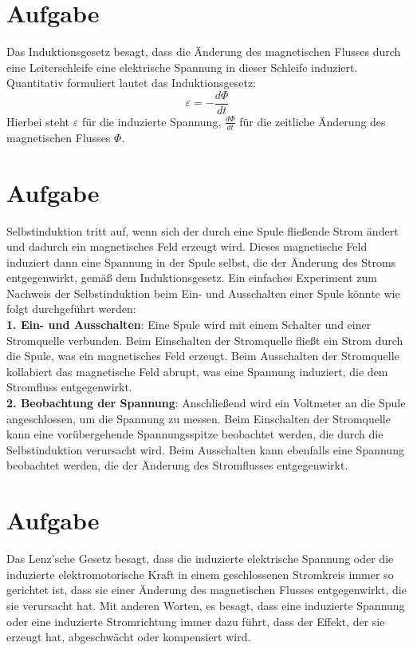 \documentclass[12pt,a4paper]{report}
\begin{document}
	\section{Aufgabe}
	Das Induktionsgesetz besagt, dass die Änderung des magnetischen Flusses durch eine Leiterschleife eine elektrische Spannung in dieser Schleife induziert. Quantitativ formuliert lautet das Induktionsgesetz:
	\[ \varepsilon = - \frac{d\Phi}{dt} \]
	Hierbei steht \( \varepsilon \) für die induzierte Spannung, \( \frac{d\Phi}{dt} \) für die zeitliche Änderung des magnetischen Flusses \( \Phi \).
	\section{Aufgabe}
	Selbstinduktion tritt auf, wenn sich der durch eine Spule fließende Strom ändert und dadurch ein magnetisches Feld erzeugt wird.
	Dieses magnetische Feld induziert dann eine Spannung in der Spule selbst, die der Änderung des Stroms entgegenwirkt, gemäß dem Induktionsgesetz.
	Ein einfaches Experiment zum Nachweis der Selbstinduktion beim Ein- und Ausschalten einer Spule könnte wie folgt durchgeführt werden:\\
	\textbf{1. Ein- und Ausschalten}: Eine Spule wird mit einem Schalter und einer Stromquelle verbunden.
	Beim Einschalten der Stromquelle fließt ein Strom durch die Spule, was ein magnetisches Feld erzeugt.
	Beim Ausschalten der Stromquelle kollabiert das magnetische Feld abrupt, was eine Spannung induziert, die dem Stromfluss entgegenwirkt.\\
	\textbf{2. Beobachtung der Spannung}: Anschließend wird ein Voltmeter an die Spule angeschlossen, um die Spannung zu messen.
	Beim Einschalten der Stromquelle kann eine vorübergehende Spannungsspitze beobachtet werden, die durch die Selbstinduktion verursacht wird.
	Beim Ausschalten kann ebenfalls eine Spannung beobachtet werden, die der Änderung des Stromflusses entgegenwirkt.
	\thispagestyle{empty}
	\section{Aufgabe}
	Das Lenz'sche Gesetz besagt, dass die induzierte elektrische Spannung oder die induzierte elektromotorische Kraft in einem geschlossenen Stromkreis immer so gerichtet ist, dass sie einer Änderung des magnetischen Flusses entgegenwirkt, die sie verursacht hat.
	Mit anderen Worten, es besagt, dass eine induzierte Spannung oder eine induzierte Stromrichtung immer dazu führt, dass der Effekt, der sie erzeugt hat, abgeschwächt oder kompensiert wird.
\end{document}
